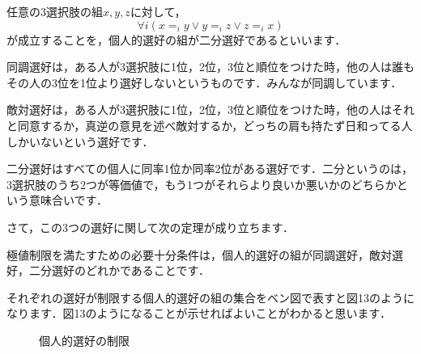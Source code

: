 \begin{dfn}[二分選好]
    任意の3選択肢の組$x,y,z$に対して，
    \begin{equation*}
        \forall i (x =_i y \lor y =_i z \lor z =_i x)
    \end{equation*}
    が成立することを，個人的選好の組が二分選好であるといいます．
\end{dfn}

同調選好は，ある人が3選択肢に1位，2位，3位と順位をつけた時，他の人は誰もその人の3位を1位より選好しないというものです．みんなが同調しています．

敵対選好は，ある人が3選択肢に1位，2位，3位と順位をつけた時，他の人はそれと同意するか，真逆の意見を述べ敵対するか，どっちの肩も持たず日和ってる人しかいないという選好です．

二分選好はすべての個人に同率1位か同率2位がある選好です．二分というのは，3選択肢のうち2つが等価値で，もう1つがそれらより良いか悪いかのどちらかという意味合いです．

さて，この3つの選好に関して次の定理が成り立ちます．

\begin{thm}
    極値制限を満たすための必要十分条件は，個人的選好の組が同調選好，敵対選好，二分選好のどれかであることです．
\end{thm}

それぞれの選好が制限する個人的選好の組の集合をベン図で表すと図13のようになります．図13のようになることが示せればよいことがわかると思います．

\begin{figure}[!h]
    \centering
    \caption{個人的選好の制限}
\end{figure}

